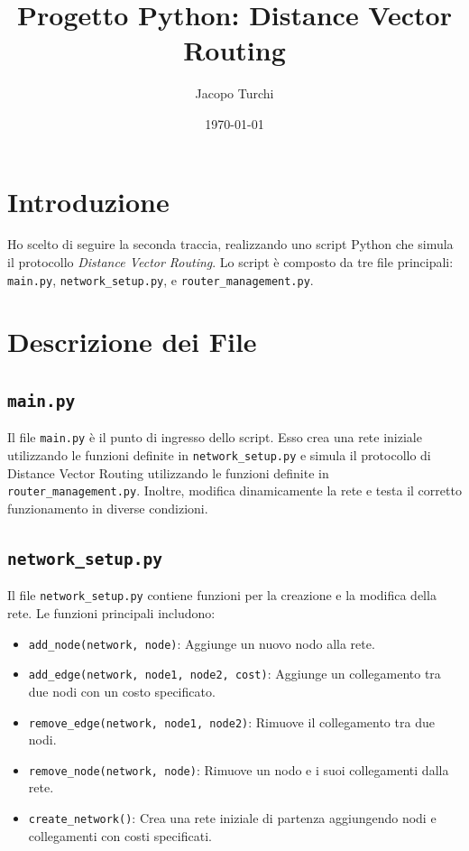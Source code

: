 \documentclass{report}
\title{Progetto Python: Distance Vector Routing}
\author{Jacopo Turchi}
\date{\today}
\begin{document}
\maketitle
\tableofcontents

\chapter{Introduzione}
Ho scelto di seguire la seconda traccia, realizzando uno script Python che simula il protocollo \textit{Distance Vector Routing}. Lo script è composto da tre file principali: \texttt{main.py}, \texttt{network\_setup.py}, e \texttt{router\_management.py}. 

\chapter{Descrizione dei File}

\section{\texttt{main.py}}
Il file \texttt{main.py} è il punto di ingresso dello script. Esso crea una rete iniziale utilizzando le funzioni definite in \texttt{network\_setup.py} e simula il protocollo di Distance Vector Routing utilizzando le funzioni definite in \texttt{router\_management.py}. Inoltre, modifica dinamicamente la rete e testa il corretto funzionamento in diverse condizioni.

\section{\texttt{network\_setup.py}}
Il file \texttt{network\_setup.py} contiene funzioni per la creazione e la modifica della rete. Le funzioni principali includono:
\begin{itemize}
    \item \texttt{add\_node(network, node)}: Aggiunge un nuovo nodo alla rete.
    \item \texttt{add\_edge(network, node1, node2, cost)}: Aggiunge un collegamento tra due nodi con un costo specificato.
    \item \texttt{remove\_edge(network, node1, node2)}: Rimuove il collegamento tra due nodi.
    \item \texttt{remove\_node(network, node)}: Rimuove un nodo e i suoi collegamenti dalla rete.
    \item \texttt{create\_network()}: Crea una rete iniziale di partenza aggiungendo nodi e collegamenti con costi specificati.
\end{itemize}
\end{document}
